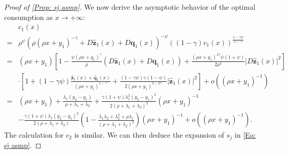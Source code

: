 \documentclass[11pt]{article}
\numberwithin{equation}{section}
\theoremstyle{definition}
\def\sz{{\boldsymbol{z}}}
\def\sq{{\boldsymbol{q}}}
\newcommand{\g}{\gamma}
\newcommand{\p}{\psi}
\newcommand{\lc}{\left(}
\newcommand{\rc}{\right)}
\theoremstyle{plain}
\begin{document}
\begin{appendices}
\begin{proof}[{}{Proof of \cref{Prop: sj asmp}}]
  We now derive the asymptotic behavior of the optimal consumption as $x\to +\infty$:
 \begin{align*}
 &c_1(x)\\
= {}&\rho^{\p}\lc \rho\lc \rho x+y_1\rc^{-\g}+D\widehat{\sz}_1(x)+D\sq_1(x)\rc^{-\p}((1-\g)v_1(x))^{\frac{1-\g \p}{1-\g}}\\
= {}& \lc \rho x+y_1\rc\left[1-\frac{\p\lc \rho x+y_1\rc^{\g}}{\rho}\left(D\widehat{\sz}_1(x)+D\widehat{\sq}_1(x)\right)+\frac{\lc \rho x+y_1\rc^{2\g}\p(1+\p)}{2\rho^2}\vert D\widehat{\sz}_1(x)\vert^2\right]\\
  {}&\cdot\left[1+(1-\g\p)\frac{\widehat{\sz}_1(x)+\widehat{\sq}_1(x)}{\lc \rho x+y_1\rc^{1-\g}}+\frac{(1-\g\p)\g(1-\p)}{2\lc \rho x+y_1\rc^{2-2\g}}\vert \widehat{\sz}_1(x)\vert^2\right]+o((\rho x+y_1)^{-1})\\
={}& \lc \rho x+y_1\rc+\frac{\lambda_1(y_{2}-y_1)}{\rho+\lambda_1+\lambda_{2}}+\frac{\g (1+\p)\lambda_1^2(y_2-y_1)^2}{2(\rho+\lambda_1+\lambda_2)^2}\lc \rho x+y_1\rc^{-1}\\
&-\frac{\g (1+\p)\lambda_1(y_2-y_1)^2}{2(\rho+\lambda_1+\lambda_2)}\lc1-\frac{\lambda_1\lambda_2+\lambda_2^2+\rho \lambda_1}{(\rho+\lambda_1+\lambda_2)^2}\rc \lc \rho x+y_1\rc^{-1}+o((\rho x+y_1)^{-1}) .
 \end{align*}
 The calculation for $c_2$ is similar. We can then deduce the expansion of $s_j$ in \cref{Eq: sj asmp}. 
\end{proof}


\end{appendices}
\end{document}
